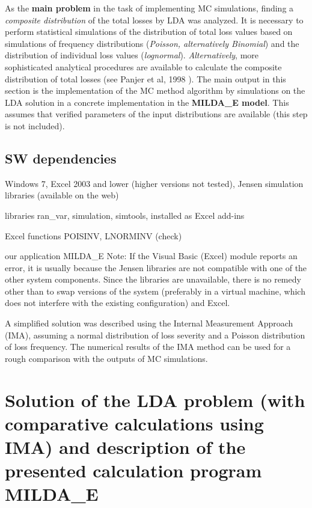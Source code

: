 \documentclass{article}
\begin{document}
As the \textbf{main problem} in the task of implementing MC simulations, finding a \emph{composite distribution} of the total losses by LDA was analyzed. It is necessary to perform statistical simulations of the distribution of total loss values based on simulations of frequency distributions (\emph{Poisson, alternatively Binomial}) and the distribution of individual loss values (\emph{lognormal}). \emph{Alternatively}, more sophisticated analytical procedures are available to calculate the composite distribution of total losses (see Panjer et al, 1998 \cite{loss}). The main output in this section is the implementation of the MC method algorithm by simulations on the LDA solution in a concrete implementation in the \textbf{MILDA\_E model}. This assumes that verified parameters of the input distributions are available (this step is not included).

\subsection{SW dependencies}

\begin{compactitem}
\item Windows 7, Excel 2003 and lower (higher versions not tested), Jensen simulation libraries (available on the web)
\item libraries ran\_var, simulation, simtools, installed as Excel add-ins
\item Excel functions POISINV, LNORMINV (check)
\item our application MILDA\_E
Note: If the Visual Basic (Excel) module reports an error, it is usually because the Jensen libraries are not compatible with one of the other system components. Since the libraries are unavailable, there is no remedy other than to swap versions of the system (preferably in a virtual machine, which does not interfere with the existing configuration) and Excel.

\end{compactitem}

A simplified solution was described using the Internal Measurement Approach (IMA), assuming a normal distribution of loss severity and a Poisson distribution of loss frequency. The numerical results of the IMA method can be used for a rough comparison with the outputs of MC simulations.


\section{Solution of the LDA problem (with comparative calculations using IMA) and description of the presented calculation program MILDA\_E}
\end{document}
